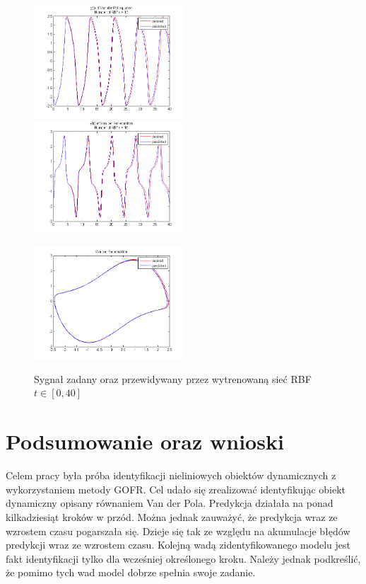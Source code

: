 \begin{figure}[ht!]
	\centering

	\subfloat
	{\includegraphics[width=0.5\textwidth]
	{images/signal_pred400.png}}
	\subfloat
	{\includegraphics[width=0.5\textwidth]
	{images/deriv_pred400.png}}	
	
	\subfloat
	{\includegraphics[width=0.5\textwidth]
	{images/trajectory_pred400.png}}

	\caption{Sygnał zadany oraz przewidywany przez wytrenowaną sieć RBF $t \in [0,40]$}
	\label{img:predicted2}
\end{figure}



\clearpage
\section{Podsumowanie oraz wnioski}
Celem pracy była próba identyfikacji nieliniowych obiektów dynamicznych z wykorzystaniem metody GOFR. Cel udało się zrealizować identyfikując obiekt dynamiczny opisany równaniem Van der Pola. Predykcja działała na ponad kilkadziesiąt kroków w przód. Można jednak zauważyć, że predykcja wraz ze wzrostem czasu pogarszała się. Dzieje się tak ze względu na akumulacje błędów predykcji wraz ze wzrostem czasu. Kolejną wadą zidentyfikowanego modelu jest fakt identyfikacji tylko dla wcześniej określonego kroku. Należy jednak podkreślić, że pomimo tych wad model dobrze spełnia swoje zadanie.



